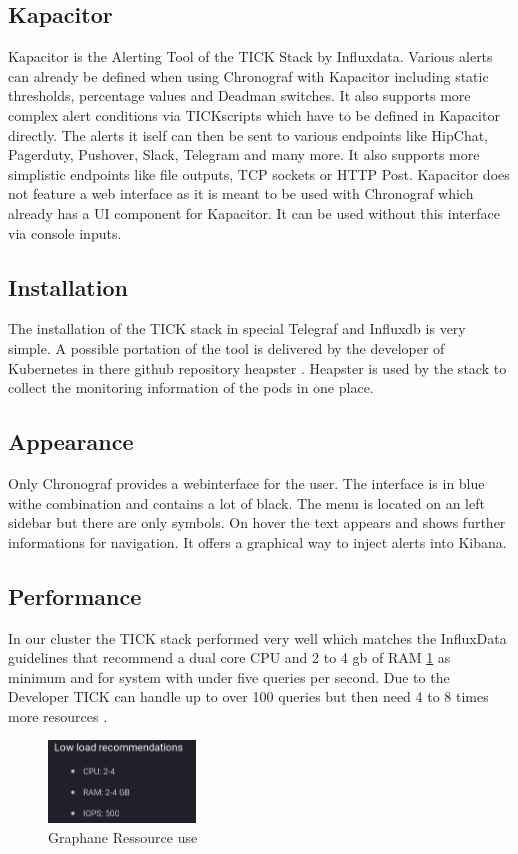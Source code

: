 \subsection{Kapacitor}
Kapacitor is the Alerting Tool of the TICK Stack by Influxdata. Various alerts can already be defined when using Chronograf with Kapacitor including static thresholds, percentage values and Deadman switches. It also supports more complex alert conditions via TICKscripts which have to be defined in Kapacitor directly.
The alerts it iself can then be sent to various endpoints like HipChat, Pagerduty, Pushover, Slack, Telegram and many more. It also supports more simplistic endpoints like file outputs, TCP sockets or HTTP Post.
Kapacitor does not feature a web interface as it is meant to be used with Chronograf which already has a UI component for Kapacitor. It can be used without this interface via console inputs.
\subsection{Installation}
The installation of the TICK stack in special Telegraf and Influxdb is very simple. A possible portation of the tool is delivered by the developer of Kubernetes in there github repository heapster \cite{heapster}. Heapster is used by the stack to collect the monitoring information of the pods in one place.
\subsection{Appearance}
Only Chronograf provides a webinterface for the user. The interface is in blue withe combination and contains a lot of black. The menu is located on an left sidebar but there are only symbols. On hover the text appears and shows further informations for navigation. It offers a graphical way to inject alerts into Kibana.

\subsection{Performance}
In our cluster the TICK stack performed very well which matches the InfluxData guidelines that recommend a dual core CPU and 2 to 4 gb of RAM \cref{fig:TICK_recommendet} as minimum and for system with under five queries per second. Due to the Developer TICK can handle up to over 100 queries but then need 4 to 8 times more resources \cite{influx_require}.
\begin{figure}
\centering
\includegraphics[width=0.35\textwidth]{Bilder/Performance/TICK_recommendet}
\caption{Graphane Ressource use}
\label{fig:TICK_recommendet}
\end{figure}

